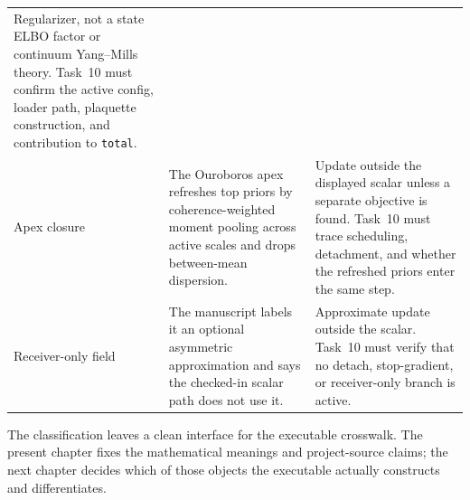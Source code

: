 \begin{longtable}{>{\raggedright\arraybackslash}p{}>{\raggedright\arraybackslash}p{}>{\raggedright\arraybackslash}p{}}
Regularizer, not a state ELBO factor or continuum Yang--Mills theory. Task~10 must confirm the active config, loader path, plaquette construction, and contribution to \texttt{total}.\\
Apex closure &
The Ouroboros apex refreshes top priors by coherence-weighted moment pooling across active scales and drops between-mean dispersion. &
Update outside the displayed scalar unless a separate objective is found. Task~10 must trace scheduling, detachment, and whether the refreshed priors enter the same step.\\
Receiver-only field &
The manuscript labels it an optional asymmetric approximation and says the checked-in scalar path does not use it. &
Approximate update outside the scalar. Task~10 must verify that no detach, stop-gradient, or receiver-only branch is active.\\
\end{longtable}
\normalsize

The classification leaves a clean interface for the executable crosswalk. The present chapter fixes the mathematical meanings and project-source claims; the next chapter decides which of those objects the executable actually constructs and differentiates.
